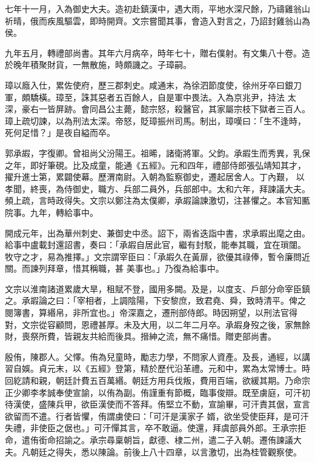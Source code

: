 \begin{pinyinscope}
 七年十一月，入為御史大夫。造初赴鎮漢中，遇大雨，平地水深尺餘，乃禱雞翁山祈晴，俄而疾風驅雲，即時開齊。文宗嘗聞其事，會造入對言之，乃詔封雞翁山為侯。



 九年五月，轉禮部尚書。其年六月病卒，時年七十，贈右僕射。有文集八十卷。造於晚年積聚財貨，一無散施，時頗譏之。子璋嗣。



 璋以廕入仕，累佐使府，歷三郡刺史。咸通末，為徐泗節度使，徐州牙卒曰銀刀軍，頗驕橫。璋至，誅其惡者五百餘人，自是軍中畏法。入為京兆尹，持法
 太深，豪右一皆屏跡。會同昌公主薨，懿宗怒，殺醫官，其家屬宗枝下獄者三百人。璋上疏切諫，以為刑法太深。帝怒，貶璋振州司馬。制出，璋嘆曰：「生不逢時，死何足惜？」是夜自縊而卒。



 郭承嘏，字復卿。曾祖尚父汾陽王。祖晞，諸衛將軍。父鈞。承嘏生而秀異，乳保之年，即好筆硯。比及成童，能通《五經》。元和四年，禮部侍郎張弘靖知其才，擢升進士第，累闢使幕。歷渭南尉。入朝為監察御史，遷起居舍人。丁內艱，
 以孝聞，終喪，為侍御史，職方、兵部二員外，兵部郎中。太和六年，拜諫議大夫。頻上疏，言時政得失。文宗以鄭注為太僕卿，承嘏論諫激切，注甚懼之。本官知匭院事。九年，轉給事中。



 開成元年，出為華州刺史、兼御史中丞。詔下，兩省迭詣中書，求承嘏出麾之由。給事中盧載封還詔書，奏曰：「承嘏自居此官，繼有封駁，能奉其職，宜在瑣闥。牧守之才，易為推擇。」文宗謂宰臣曰：「承嘏久在黃扉，欲優其祿俸，暫令廉問近關。而諫列拜章，惜其稱職，甚
 美事也。」乃復為給事中。



 文宗以淮南諸道累歲大旱，租賦不登，國用多闕。及是，以度支、戶部分命宰臣鎮之。承嘏論之曰：「宰相者，上調陰陽，下安黎庶，致君堯、舜，致時清平。俾之閱簿書，算緡帛，非所宜也。」帝深嘉之，遷刑部侍郎。時因朔望，以刑法官得對，文宗從容顧問，恩禮甚厚。未及大用，以二年二月卒。承嘏身歿之後，家無餘財，喪祭所費，皆親友共給而後具。搢紳之流，無不痛惜。贈吏部尚書。



 殷侑，陳郡人。父懌。侑為兒童時，勵志力學，不問家人資產。及長，通經，以講習自娛。貞元末，以《五經》登第，精於歷代沿革禮。元和中，累為太常博士。時回紇請和親，朝廷計費五百萬緡。朝廷方用兵伐叛，費用百端，欲緩其期。乃命宗正少卿李孝誠奉使宣諭，以侑為副。侑謹重有節概，臨事俊辯。既至虜庭，可汗初待漢使，盛陳兵甲，欲臣漢使而不答拜。侑堅立不動，宣諭畢，可汗責其倨，宣言欲留而不遣。行者皆懼，侑謂虜使曰：「可汗是漢家子
 婿，欲坐受使臣拜，是可汗失禮，非使臣之倨也。」可汗憚其言，卒不敢逼。使還，拜虞部員外郎。王承宗拒命，遣侑銜命招諭之。承宗尋稟朝旨，獻德、棣二州，遣二子入朝。遷侑諫議大夫。凡朝廷之得失，悉以陳論。前後上八十四章，以言激切，出為桂管觀察使。




\end{pinyinscope}
